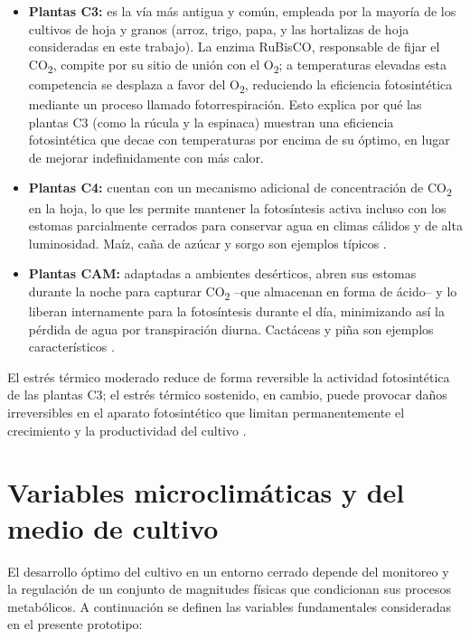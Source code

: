 \begin{itemize}
    \item \textbf{Plantas C3:} es la vía más antigua y común, empleada por la mayoría de los cultivos de hoja y granos (arroz, trigo, papa, y las hortalizas de hoja consideradas en este trabajo). La enzima RuBisCO, responsable de fijar el CO\textsubscript{2}, compite por su sitio de unión con el O\textsubscript{2}; a temperaturas elevadas esta competencia se desplaza a favor del O\textsubscript{2}, reduciendo la eficiencia fotosintética mediante un proceso llamado fotorrespiración. Esto explica por qué las plantas C3 (como la rúcula y la espinaca) muestran una eficiencia fotosintética que decae con temperaturas por encima de su óptimo, en lugar de mejorar indefinidamente con más calor.
    \item \textbf{Plantas C4:} cuentan con un mecanismo adicional de concentración de CO\textsubscript{2} en la hoja, lo que les permite mantener la fotosíntesis activa incluso con los estomas parcialmente cerrados para conservar agua en climas cálidos y de alta luminosidad. Maíz, caña de azúcar y sorgo son ejemplos típicos \cite{ramos2015}.
    \item \textbf{Plantas CAM:} adaptadas a ambientes desérticos, abren sus estomas durante la noche para capturar CO\textsubscript{2} --que almacenan en forma de ácido-- y lo liberan internamente para la fotosíntesis durante el día, minimizando así la pérdida de agua por transpiración diurna. Cactáceas y piña son ejemplos característicos \cite{ramos2015}.
\end{itemize}

El estrés térmico moderado reduce de forma reversible la actividad fotosintética de las plantas C3; el estrés térmico sostenido, en cambio, puede provocar daños irreversibles en el aparato fotosintético que limitan permanentemente el crecimiento y la productividad del cultivo \cite{ramos2015}.

\section{Variables microclimáticas y del medio de cultivo}
\label{sec:variables_microclimaticas}

El desarrollo óptimo del cultivo en un entorno cerrado depende del monitoreo y la regulación de un conjunto de magnitudes físicas que condicionan sus procesos metabólicos. A continuación se definen las variables fundamentales consideradas en el presente prototipo:

